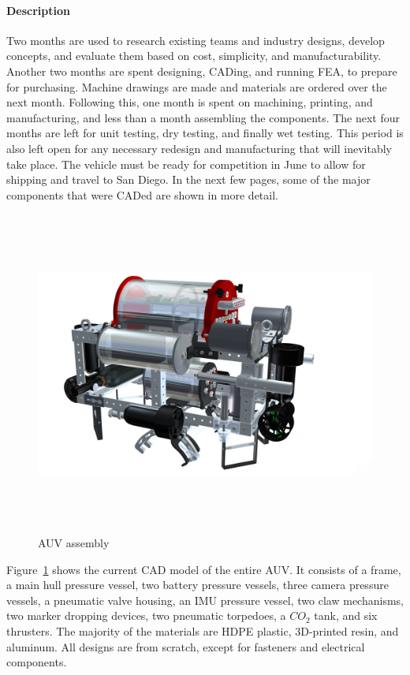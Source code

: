 \documentclass[12pt, landscape]{article}
\begin{document}
		\paragraph{Description} Two months are used to research existing teams and industry designs, develop concepts, and evaluate them based on cost, simplicity, and manufacturability.  Another two months are spent designing, CADing, and running FEA, to prepare for purchasing.  Machine drawings are made and materials are ordered over the next month.  Following this, one month is spent on machining, printing, and manufacturing, and less than a month assembling the components.  The next four months are left for unit testing, dry testing, and finally wet testing.  This period is also left open for any necessary redesign and manufacturing that will inevitably take place.  The vehicle must be ready for competition in June to allow for shipping and travel to San Diego.
		In the next few pages, some of the major components that were CADed are shown in more detail.

	\begin{samepage}
		\begin{figure}[H]
			\centering
			\includegraphics[height=4.2in]{media/full_assembly.png}
			\caption{AUV assembly}
			\label{auv_assembly}
		\end{figure}

		Figure~\ref{auv_assembly} shows the current CAD model of the entire AUV. It consists of a frame, a main hull pressure vessel, two battery pressure vessels, three camera pressure vessels, a pneumatic valve housing, an IMU pressure vessel, two claw mechanisms, two marker dropping devices, two pneumatic torpedoes, a $CO_2$ tank, and six thrusters.  The majority of the materials are HDPE plastic, 3D-printed resin, and aluminum.  All designs are from scratch, except for fasteners and electrical components. 
	\end{samepage}
\end{document}
